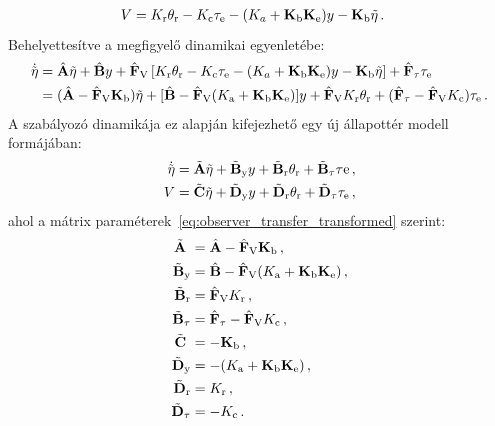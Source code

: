 \begin{equation}
    \begin{split}
        V &= K_{\mathrm{r}} \theta_{\mathrm{r}} - K_{\mathrm{c}} \tau_{\mathrm{e}} - (K_a + \mathbf{K}_{\mathrm{b}} \mathbf{K}_{\mathrm{e}}) y - \mathbf{K}_{\mathrm{b}} \tilde{\mathbf{\eta}}\,.
    \end{split}
\end{equation}
Behelyettesítve a megfigyelő dinamikai egyenletébe:
\begin{align}\label{eq:observer_transfer_transformed}
    \begin{split}
        \dot{\tilde{\mathbf{\eta}}} &= \hat{\mathbf{A}} \tilde{\mathbf{\eta}} + 
        \hat{\mathbf{B}} y + 
        \hat{\mathbf{F}}_{\mathrm{V}}\left[K_{\mathrm{r}} \theta_{\mathrm{r}} - K_{\mathrm{c}} \tau_{\mathrm{e}} - (K_a + \mathbf{K}_{\mathrm{b}} \mathbf{K}_{\mathrm{e}}) y - \mathbf{K}_{\mathrm{b}} \tilde{\mathbf{\eta}}\right] + 
        \hat{\mathbf{F}}_{\mathrm{\tau}} \tau_{\mathrm{e}} \\
        &= (\hat{\mathbf{A}} - \hat{\mathbf{F}}_{\mathrm{V}} \mathbf{K}_{\mathrm{b}})\tilde{\mathbf{\eta}} + 
        [\hat{\mathbf{B}} - \hat{\mathbf{F}}_{\mathrm{V}} (K_{\mathrm{a}} + \mathbf{K}_{\mathrm{b}} \mathbf{K}_{\mathrm{e}})]y + 
        \hat{\mathbf{F}}_{\mathrm{V}} K_{\mathrm{r}} \theta_{\mathrm{r}} + 
        (\hat{\mathbf{F}}_{\mathrm{\tau}} - \hat{\mathbf{F}}_{\mathrm{V}} K_{\mathrm{c}}) \tau_{\mathrm{e}}\,.
    \end{split}
\end{align}
A szabályozó dinamikája ez alapján kifejezhető egy új állapottér modell formájában:
\begin{align}\label{eq:controller_state_space}
    \begin{split}
        \dot{\tilde{\mathbf{\eta}}} &= \tilde{\mathbf{A}}\tilde{\mathbf{\eta}} + 
        \tilde{\mathbf{B}}_{\mathrm{y}} y + 
        \tilde{\mathbf{B}}_{\mathrm{r}} \theta_{\mathrm{r}} +
        \tilde{\mathbf{B}}_{\mathrm{\tau}} \tau\mathrm{e}\,, \\
        V &= \tilde{\mathbf{C}}\tilde{\mathbf{\eta}} + 
        \tilde{\mathbf{D}}_{\mathrm{y}} y + 
        \tilde{\mathbf{D}}_{\mathrm{r}} \theta_{\mathrm{r}} + 
        \tilde{\mathbf{D}}_{\mathrm{\tau}} \tau_{\mathrm{e}}\,,
    \end{split}
\end{align}
ahol a mátrix paraméterek~\eqref{eq:observer_transfer_transformed} szerint:
\begin{align}
    \begin{split}
        \tilde{\mathbf{A}}\ &= \hat{\mathbf{A}} - \hat{\mathbf{F}}_{\mathrm{V}} \mathbf{K}_{\mathrm{b}}\,,\\
        \tilde{\mathbf{B}}_{\mathrm{y}} &= \hat{\mathbf{B}} - \hat{\mathbf{F}}_{\mathrm{V}} (K_{\mathrm{a}} + \mathbf{K}_{\mathrm{b}} \mathbf{K}_{\mathrm{e}})\,,\\
        \tilde{\mathbf{B}}_{\mathrm{r}} &= \hat{\mathbf{F}}_{\mathrm{V}} K_{\mathrm{r}}\,, \\
        \tilde{\mathbf{B}}_{\mathrm{\tau}} &= \hat{\mathbf{F}}_{\mathrm{\tau}} - \hat{\mathbf{F}}_{\mathrm{V}} K_{\mathrm{c}}\,, \\
        \tilde{\mathbf{C}}\ &= -\mathbf{K}_{\mathrm{b}}\,, \\
        \tilde{\mathbf{D}}_{\mathrm{y}} &= -(K_{\mathrm{a}} + \mathbf{K}_{\mathrm{b}} \mathbf{K}_{\mathrm{e}})\,, \\
        \tilde{\mathbf{D}}_{\mathrm{r}} &= K_{\mathrm{r}}\,, \\
        \tilde{\mathbf{D}}_{\mathrm{\tau}} &= -K_{\mathrm{c}}\,.
    \end{split}
\end{align}
